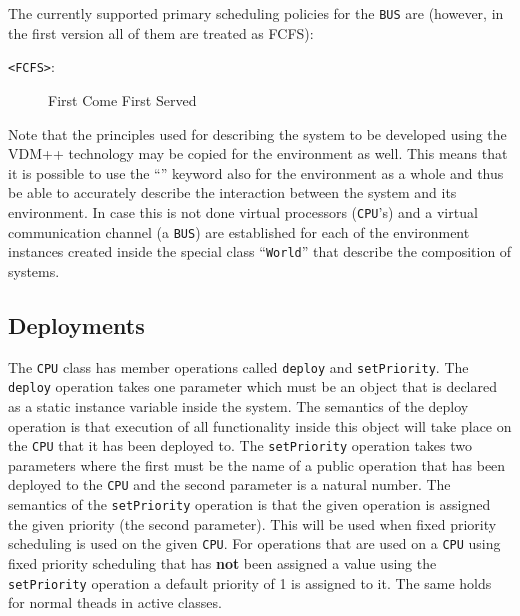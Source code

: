 \documentclass{overturerepchap}
\newcommand{\keyw}[1]{{\bf\ttfamily{#1}}}
\begin{document}
The currently supported primary scheduling policies for the \texttt{BUS}
are (however, in the first version all of them are treated as FCFS):
\begin{description}
\item[\texttt{<FCFS>}:] First Come First Served
\end{description} 

Note that the principles used for describing the system to be developed using 
the VDM++ technology may be copied for the environment as well. This means that
it is possible to use the ``\keyw{system}'' keyword also for the environment as
a whole and thus be able to accurately describe the interaction between the
system and its environment. In case this is not done virtual processors 
(\texttt{CPU}'s)
and a virtual communication channel (a \texttt{BUS}) 
are established for each of the
environment instances created inside the special class ``\texttt{World}''
that describe the composition of systems.

\subsection{Deployments}

The \texttt{CPU} class has member operations called \texttt{deploy} and
\texttt{setPriority}. The \texttt{deploy} operation takes one parameter
which must be an object that is declared as a static instance variable
inside the system. The semantics of the deploy operation is that execution
of all functionality inside this object will take place on the 
\texttt{CPU} that it
has been deployed to. The \texttt{setPriority} operation takes two 
parameters where the first must be the name of a public operation that 
has been deployed to the \texttt{CPU}
 and the second parameter is a natural number.
The semantics of the \texttt{setPriority} operation is that the given 
operation is assigned the given priority (the second parameter). This will
be used when fixed priority scheduling is used on the given
\texttt{CPU}. For operations that are used on a \texttt{CPU} using
fixed priority scheduling that has \textbf{not} been assigned a value
using the \texttt{setPriority} operation a default priority of 1 is
assigned to it. The same holds for normal theads in active classes.
\end{document}
